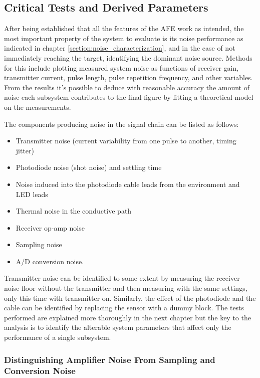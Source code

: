 \subsection{Critical Tests and Derived Parameters}

After being established that all the features of the AFE work as intended, the most important property of the system to evaluate is its noise performance as indicated in chapter \ref{section:noise_characterization}, and in the case of not immediately reaching the target, identifying the dominant noise source. Methods for this include plotting measured system noise as functions of receiver gain, transmitter current, pulse length, pulse repetition frequency, and other variables. From the results it's possible to deduce with reasonable accuracy the amount of noise each subsystem contributes to the final figure by fitting a theoretical model on the measurements.

The components producing noise in the signal chain can be listed as follows:
\begin{itemize}
	\item Transmitter noise (current variability from one pulse to another, timing jitter)
	\item Photodiode noise (shot noise) and settling time
	\item Noise induced into the photodiode cable leads from the environment and LED leads
	\item Thermal noise in the conductive path
	\item Receiver op-amp noise
	\item Sampling noise
	\item A/D conversion noise.
\end{itemize}

Transmitter noise can be identified to some extent by measuring the receiver noise floor without the transmitter and then measuring with the same settings, only this time with transmitter on. Similarly, the effect of the photodiode and the cable can be identified by replacing the sensor with a dummy block. The tests performed are explained more thoroughly in the next chapter but the key to the analysis is to identify the alterable system parameters that affect only the performance of a single subsystem.

\subsubsection{Distinguishing Amplifier Noise From Sampling and Conversion Noise}

